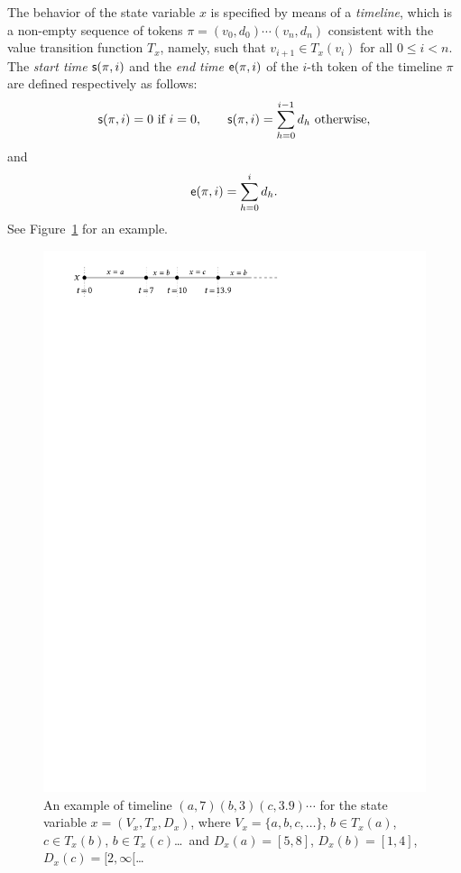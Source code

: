 The behavior of the state variable $x$ is specified by means of a \emph{timeline}, which is a non-empty sequence of tokens
$\pi = (v_0,d_0)\cdots  (v_n,d_n)$  consistent with the value transition function $T_x$, namely, such that
$v_{i+1}\in T_x(v_i)$ for all $0\leq i<n$. The \emph{start time} $\mathsf{s}(\pi,i)$ and the \emph{end time} $\mathsf{e}(\pi,i)$ of the $i$-th token of the timeline
$\pi$  are defined respectively as follows: 
\[\mathsf{s}(\pi,i)=0 \text{ if } i=0, \qquad \mathsf{s}(\pi,i)=\sum_{h=0}^{i-1} d_h \text{ otherwise},\]
and
\[\mathsf{e}(\pi,i)=\sum_{h=0}^{i} d_h.\]
%
See Figure~\ref{fig:timelineEx} for an example.
\begin{figure}
    \centering
    \includegraphics[scale=0.7]{Chaps/Timelines/timelineFig0.pdf}
    \caption{An example of timeline $(a,7)(b,3)(c,3.9)\cdots$ for the state variable $x= (V_x,T_x,D_x)$, where $V_x=\{a,b,c,\ldots\}$, $b\in T_x(a)$, $c\in T_x(b)$, $b\in T_x(c)$\dots\ and $D_x(a)=[5,8]$, $D_x(b)=[1,4]$, $D_x(c)=[2,\infty[$\dots}
    \label{fig:timelineEx}
\end{figure}

